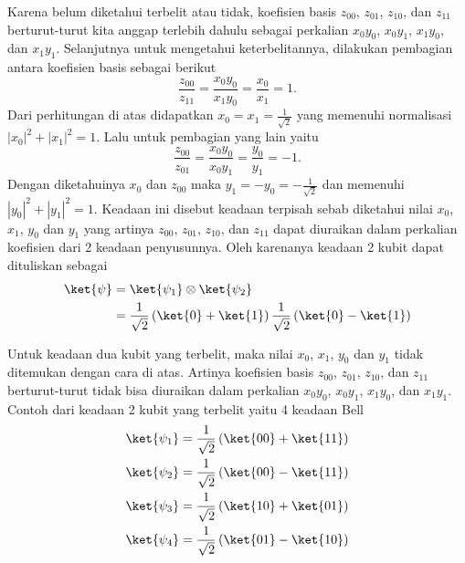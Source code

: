 Karena belum diketahui terbelit atau tidak, koefisien basis $z_{00}$, $z_{01}$, $z_{10}$, dan $z_{11}$ berturut-turut kita anggap terlebih dahulu sebagai perkalian $x_0y_0$, $x_0y_1$, $x_1y_0$, dan $x_1y_1$. Selanjutnya untuk mengetahui keterbelitannya, dilakukan pembagian antara koefisien basis sebagai berikut
\begin{equation}
	\frac{z_{00}}{z_{11}}=\frac{x_0y_0}{x_1y_0}=\frac{x_0}{x_1}=1.
\end{equation}
Dari perhitungan di atas didapatkan $x_0=x_1=\frac{1}{\sqrt{2}}$ yang memenuhi normalisasi $|x_0|^2+|x_1|^2=1$. Lalu untuk pembagian yang lain yaitu
\begin{equation}
	\frac{z_{00}}{z_{01}}=\frac{x_0y_0}{x_0y_1}=\frac{y_0}{y_1}=-1.
\end{equation}
Dengan diketahuinya $x_0$ dan $z_{00}$ maka $y_1=-y_0=-\frac{1}{\sqrt{2}}$ dan memenuhi $|y_0|^2+|y_1|^2=1$. Keadaan ini disebut keadaan terpisah sebab diketahui nilai $x_0$, $x_1$, $y_0$ dan $y_1$ yang artinya $z_{00}$, $z_{01}$, $z_{10}$, dan $z_{11}$ dapat diuraikan dalam perkalian koefisien dari 2 keadaan penyusunnya. Oleh karenanya keadaan 2 kubit dapat dituliskan sebagai
\begin{equation}
	\begin{aligned}
		\ket{\psi}&=\ket{\psi_1}\otimes\ket{\psi_2}\\
		&=\frac{1}{\sqrt{2}}\left(\ket{0}+\ket{1}\right)\frac{1}{\sqrt{2}}\left(\ket{0}-\ket{1}\right)
	\end{aligned}
\end{equation}
\par
Untuk keadaan dua kubit yang terbelit, maka nilai $x_0$, $x_1$, $y_0$ dan $y_1$ tidak ditemukan dengan cara di atas. Artinya koefisien basis $z_{00}$, $z_{01}$, $z_{10}$, dan $z_{11}$ berturut-turut tidak bisa diuraikan dalam perkalian $x_0y_0$, $x_0y_1$, $x_1y_0$, dan $x_1y_1$. Contoh dari keadaan 2 kubit yang terbelit yaitu 4 keadaan Bell \cite{zeilinger1998entanglement}
\begin{equation}
	\begin{aligned}
		\ket{\psi_1}&=\frac{1}{\sqrt{2}}\left(\ket{00}+\ket{11}\right)\\
		\ket{\psi_2}&=\frac{1}{\sqrt{2}}\left(\ket{00}-\ket{11}\right)\\
		\ket{\psi_3}&=\frac{1}{\sqrt{2}}\left(\ket{10}+\ket{01}\right)\\
		\ket{\psi_4}&=\frac{1}{\sqrt{2}}\left(\ket{01}-\ket{10}\right)
	\end{aligned}
\end{equation}


